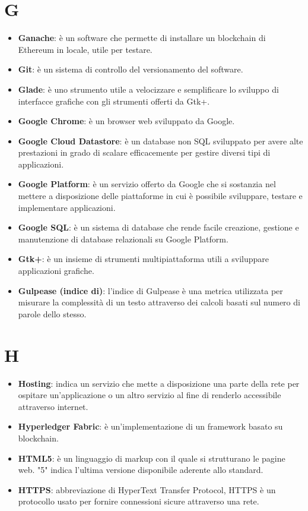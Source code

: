 \documentclass[a4paper, oneside, openany, dvipsnames, table]{article}
\begin{document}
\section{G}
\begin{itemize}
\item \textbf{Ganache}: è un software che permette di installare un blockchain di Ethereum in locale, utile per testare.
\item \textbf{Git}: è un sistema di controllo del versionamento del software.
\item \textbf{Glade}: è uno strumento utile a velocizzare e semplificare lo sviluppo di interfacce grafiche con gli strumenti offerti da Gtk+.
\item \textbf{Google Chrome}: è un browser web sviluppato da Google.
\item \textbf{Google Cloud Datastore}: è un database non SQL sviluppato per avere alte prestazioni in grado di scalare efficacemente per gestire diversi tipi di applicazioni.
\item \textbf{Google Platform}: è un servizio offerto da Google che si sostanzia nel mettere a disposizione delle piattaforme in cui è possibile sviluppare, testare e implementare applicazioni.
\item \textbf{Google SQL}: è un sistema di database che rende facile creazione, gestione e manutenzione di database relazionali su Google Platform.
\item \textbf{Gtk+}: è un insieme di strumenti multipiattaforma utili a sviluppare applicazioni grafiche.
\item \textbf{Gulpease (indice di)}: l'indice di Gulpease è una metrica utilizzata per misurare la complessità di un testo attraverso dei calcoli basati sul numero di parole dello stesso.
\end{itemize}

\section{H}
\begin{itemize}
\item \textbf{Hosting}: indica un servizio che mette a disposizione una parte della rete per ospitare un'applicazione o un altro servizio al fine di renderlo accessibile attraverso internet.
\item \textbf{Hyperledger Fabric}: è un'implementazione di un framework basato su blockchain.
\item \textbf{HTML5}: è un linguaggio di markup con il quale si strutturano le pagine web. "5" indica l'ultima versione disponibile aderente allo standard.
\item \textbf{HTTPS}: abbreviazione di HyperText Transfer Protocol, HTTPS è un protocollo usato per fornire connessioni sicure attraverso una rete.
\end{itemize}
\end{document}
